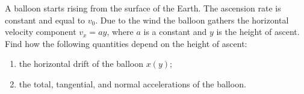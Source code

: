 
\item A balloon starts rising from the surface of the Earth. The ascension rate is constant and equal to \( v_0 \). Due to the wind the balloon gathers the horizontal velocity component \( v_x = ay \), where \( a \) is a constant and \( y \) is the height of ascent. Find how the following quantities depend on the height of ascent:
    \begin{enumerate}
        \item the horizontal drift of the balloon \( x(y) \);
        \item the total, tangential, and normal accelerations of the balloon.
    \end{enumerate}
